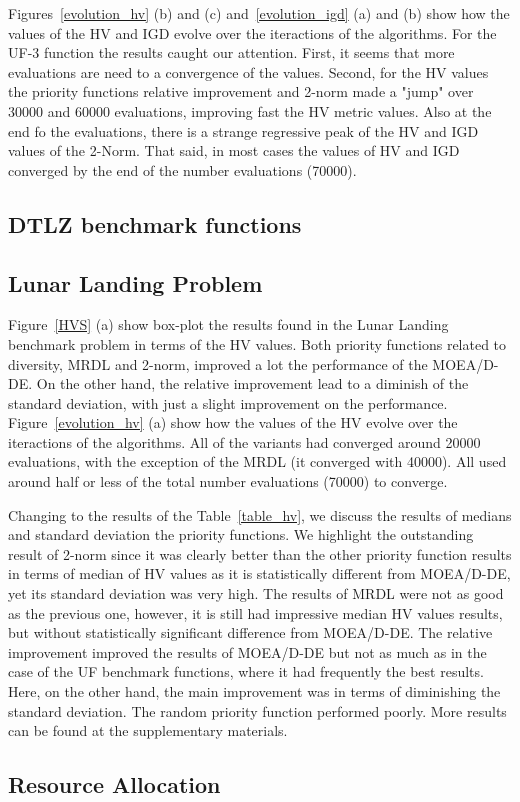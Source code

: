  Figures~\ref{evolution_hv} (b) and (c) and~\ref{evolution_igd} (a) and (b) show how the values of the HV and IGD evolve over the iteractions of the algorithms. For the UF-3 function the results caught our attention. First, it seems that more evaluations are need to a convergence of the values. Second, for the HV values the priority functions relative improvement and 2-norm made a "jump" over 30000 and 60000 evaluations, improving fast the HV metric values. Also at the end fo the evaluations, there is a strange regressive peak of the HV and IGD values of the 2-Norm. That said, in most cases the values of HV and IGD converged by the end of the number evaluations (70000).

\subsection{DTLZ benchmark functions}



\subsection{Lunar Landing Problem}


Figure~\ref{HVS} (a) show box-plot the results found in the Lunar Landing benchmark problem in terms of the HV values. Both priority functions related to diversity, MRDL and 2-norm, improved a lot the performance of the MOEA/D-DE. On the other hand, the relative improvement lead to a diminish of the standard deviation, with just a slight improvement on the performance.  Figure~\ref{evolution_hv} (a) show how the values of the HV evolve over the iteractions of the algorithms. All of the variants had converged around 20000 evaluations, with the exception of the MRDL (it converged with 40000). All used around half or less of the total number evaluations (70000) to converge.

Changing to the results of the Table~\ref{table_hv}, we discuss the results of medians and standard deviation the priority functions.  We highlight the outstanding result of 2-norm since it was clearly better than the other priority function results in terms of median of HV values as it is statistically different from MOEA/D-DE, yet its standard deviation was very high. The results of MRDL were not as good as the previous one, however, it is still had impressive median HV values results, but without statistically significant difference from MOEA/D-DE. The relative improvement improved the results of MOEA/D-DE but not as much as in the case of the UF benchmark functions, where it had frequently the best results. Here, on the other hand, the main improvement was in terms of diminishing the standard deviation. The random priority function performed poorly. More results can be found at the supplementary materials.

\subsection{Resource Allocation}

